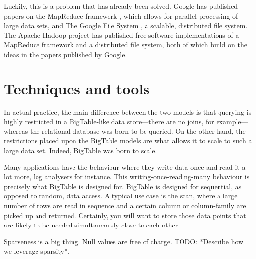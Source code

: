 Luckily, this is a problem that has already been solved. Google has published
papers on the MapReduce framework \cite{mapreduce}, which allows for parallel
processing of large data sets, and The Google File System \cite{gfs}, a
scalable, distributed file system. The Apache Hadoop \cite{hadoop} project has
published free software implementations of a MapReduce framework and a
distributed file system, both of which build on the ideas in the papers
published by Google.


\section{Techniques and tools}


In actual practice, the main difference between the two models is that
querying is highly restricted in a BigTable-like data store---there are no
joins, for example---whereas the relational database was born to be queried.
On the other hand, the restrictions placed upon the BigTable models are
what allows it to scale to such a large data set. Indeed, BigTable was born
to scale.


Many applications have the behaviour where they write data once and read it
a lot more, log analysers for instance. This writing-once-reading-many
behaviour is precisely what BigTable is designed for. BigTable is designed
for sequential, as opposed to random, data access. A typical use case is
the scan, where a large number of rows are read in sequence and a certain
column or column-family are picked up and returned. Certainly, you will
want to store those data points that are likely to be needed simultaneously
close to each other. \cite{bigtable}

Sparseness is a big thing. Null values are free of charge. TODO: *Describe
how we leverage sparsity*.



